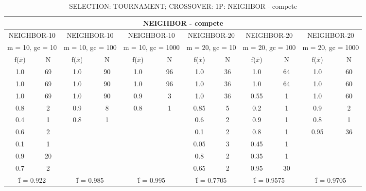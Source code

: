 \begin{table}[H]
	\centering
	\caption{SELECTION: TOURNAMENT; CROSSOVER: 1P: NEIGHBOR - compete}
	\begin{adjustbox}{width=1\textwidth}
		\begin{tabular}{ |c|c||c|c||c|c||c|c||c|c||c|c| }
			\hline
			\multicolumn{12}{|c|}{NEIGHBOR - compete} \\
			\hline
			\multicolumn{2}{|c||}{NEIGHBOR-10} & \multicolumn{2}{c||}{NEIGHBOR-10} & \multicolumn{2}{c||}{NEIGHBOR-10} & \multicolumn{2}{c||}{NEIGHBOR-20} & \multicolumn{2}{c||}{NEIGHBOR-20} & \multicolumn{2}{c|}{NEIGHBOR-20}\\
			\hline
			\multicolumn{2}{|c||}{m = 10, gc = 10} & \multicolumn{2}{c||}{m = 10, gc = 100} & \multicolumn{2}{c||}{m = 10, gc = 1000} & \multicolumn{2}{c||}{m = 20, gc = 10} & \multicolumn{2}{c||}{m = 20, gc = 100} & \multicolumn{2}{c|}{m = 20, gc = 1000}\\
			\hline
			f($\bar{x}$) & N & f($\bar{x}$) & N & f($\bar{x}$) & N & f($\bar{x}$) & N & f($\bar{x}$) & N & f($\bar{x}$) & N\\
			\hline
			\hline
			1.0 & 69 & 1.0 & 90 & 1.0 & 96 & 1.0 & 36 & 1.0 & 64 & 1.0 & 60\\
			\hline
			1.0 & 69 & 1.0 & 90 & 1.0 & 96 & 1.0 & 36 & 1.0 & 64 & 1.0 & 60\\
			1.0 & 69 & 1.0 & 90 & 0.9 & 3 & 1.0 & 36 & 0.55 & 1 & 1.0 & 60\\
			0.8 & 2 & 0.9 & 8 & 0.8 & 1 & 0.85 & 5 & 0.2 & 1 & 0.9 & 2\\
			0.4 & 1 & 0.8 & 1 &   &   & 0.6 & 2 & 0.9 & 1 & 0.8 & 1\\
			0.6 & 2 &   &   &   &   & 0.1 & 2 & 0.8 & 1 & 0.95 & 36\\
			0.1 & 1 &   &   &   &   & 0.05 & 3 & 0.45 & 1 &   &  \\
			0.9 & 20 &   &   &   &   & 0.8 & 2 & 0.35 & 1 &   &  \\
			0.7 & 2 &   &   &   &   & 0.65 & 2 & 0.95 & 30 &   &  \\
			\hline
			\multicolumn{2}{|c||}{\^{f} = 0.922} & \multicolumn{2}{c||}{\^{f} = 0.985} & \multicolumn{2}{c||}{\^{f} = 0.995} & \multicolumn{2}{c||}{\^{f} = 0.7705} & \multicolumn{2}{c||}{\^{f} = 0.9575} & \multicolumn{2}{c|}{\^{f} = 0.9705}\\
			\hline
		\end{tabular}
	\end{adjustbox}
\end{table}
